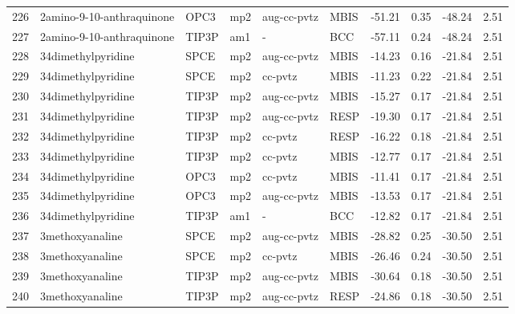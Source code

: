 \begin{tabular}{llllllrrrr}
226 &      2amino-9-10-anthraquinone &       OPC3 &      mp2 &  aug-cc-pvtz &         MBIS & -51.21 &      0.35 &      -48.24 &     2.51 \\
227 &      2amino-9-10-anthraquinone &      TIP3P &      am1 &            - &          BCC & -57.11 &      0.24 &      -48.24 &     2.51 \\
228 &             34dimethylpyridine &       SPCE &      mp2 &  aug-cc-pvtz &         MBIS & -14.23 &      0.16 &      -21.84 &     2.51 \\
229 &             34dimethylpyridine &       SPCE &      mp2 &      cc-pvtz &         MBIS & -11.23 &      0.22 &      -21.84 &     2.51 \\
230 &             34dimethylpyridine &      TIP3P &      mp2 &  aug-cc-pvtz &         MBIS & -15.27 &      0.17 &      -21.84 &     2.51 \\
231 &             34dimethylpyridine &      TIP3P &      mp2 &  aug-cc-pvtz &         RESP & -19.30 &      0.17 &      -21.84 &     2.51 \\
232 &             34dimethylpyridine &      TIP3P &      mp2 &      cc-pvtz &         RESP & -16.22 &      0.18 &      -21.84 &     2.51 \\
233 &             34dimethylpyridine &      TIP3P &      mp2 &      cc-pvtz &         MBIS & -12.77 &      0.17 &      -21.84 &     2.51 \\
234 &             34dimethylpyridine &       OPC3 &      mp2 &      cc-pvtz &         MBIS & -11.41 &      0.17 &      -21.84 &     2.51 \\
235 &             34dimethylpyridine &       OPC3 &      mp2 &  aug-cc-pvtz &         MBIS & -13.53 &      0.17 &      -21.84 &     2.51 \\
236 &             34dimethylpyridine &      TIP3P &      am1 &            - &          BCC & -12.82 &      0.17 &      -21.84 &     2.51 \\
237 &                3methoxyanaline &       SPCE &      mp2 &  aug-cc-pvtz &         MBIS & -28.82 &      0.25 &      -30.50 &     2.51 \\
238 &                3methoxyanaline &       SPCE &      mp2 &      cc-pvtz &         MBIS & -26.46 &      0.24 &      -30.50 &     2.51 \\
239 &                3methoxyanaline &      TIP3P &      mp2 &  aug-cc-pvtz &         MBIS & -30.64 &      0.18 &      -30.50 &     2.51 \\
240 &                3methoxyanaline &      TIP3P &      mp2 &  aug-cc-pvtz &         RESP & -24.86 &      0.18 &      -30.50 &     2.51 \\

\end{tabular}

